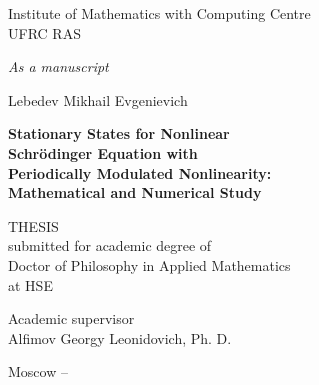 \begin{titlepage}
\thispagestyle{empty}
\enlargethispage{1cm}
\vspace*{-2cm}

\begin{center}
	Institute of Mathematics with Computing Centre \\ UFRC RAS
\end{center}

\vskip1cm
	
\begin{flushright}
	\emph{As a manuscript}
\end{flushright}
	
\vskip3cm

\begin{center}
	{\large Lebedev Mikhail Evgenievich}
	\vskip1cm
	{\Large\bfseries Stationary States for Nonlinear \\ Schr\"odinger Equation with \\ Periodically Modulated Nonlinearity: \\ Mathematical and Numerical Study\par}
	\vskip1.5cm
	{THESIS \\ submitted for academic degree of \\ Doctor of Philosophy in Applied Mathematics \\ at HSE}
\end{center}

\vskip2cm

\hspace{8cm}\begin{minipage}{0.45\linewidth}
	Academic supervisor \\
	Alfimov Georgy Leonidovich, Ph. D.
\end{minipage}

\vfill

\begin{center}
	{Moscow -- \the\year}
\end{center}

\normalfont\clearpage
\end{titlepage}
